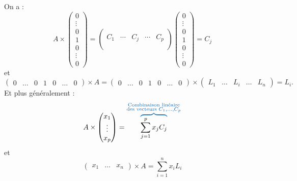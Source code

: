 \documentclass{book}
\begin{document}
\begin{Proposition}
On a : 
$$A\times\begin{pmatrix}0\\\vdots\\0\\1\text{}\\0\\\vdots\\0\end{pmatrix}=\begin{pmatrix}
&  & \\
C_1 & \cdots&C_j&\cdots & C_{p}\\
&  & \\\end{pmatrix} \begin{pmatrix}0\\\vdots\\0\\1\\0\\\vdots\\0\end{pmatrix}=C_j$$
et
$$\begin{pmatrix}0&\dots&0& 1&0&\ldots&0\end{pmatrix} \times A= \begin{pmatrix}0&\dots&0& 1&0&\ldots&0\end{pmatrix} \times \begin{pmatrix}L_1&\dots& L_i&\ldots&L_n\end{pmatrix}=L_i.$$
Et plus généralement :
$$A\times\begin{pmatrix}x_1\\\vdots\\x_p\end{pmatrix}=\overbrace{\color{black}\sum_{j=1}^p x_j C_j}^{\color{colorprop}\substack{\text{Combinaison linéaire}\\\text{des vecteurs }C_1,\dots,C_p}}$$
et
$$\begin{pmatrix}x_1&\dots&x_n\end{pmatrix}\times A=\sum_{i=1}^n x_i L_i$$

\end{Proposition}
\end{document}
